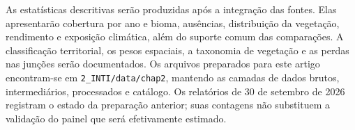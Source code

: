 As estatísticas descritivas serão produzidas após a integração das fontes. Elas apresentarão cobertura por ano e bioma, ausências, distribuição da vegetação, rendimento e exposição climática, além do suporte comum das comparações. A classificação territorial, os pesos espaciais, a taxonomia de vegetação e as perdas nas junções serão documentados. Os arquivos preparados para este artigo encontram-se em \texttt{2\_INTI/data/chap2}, mantendo as camadas de dados brutos, intermediários, processados e catálogo. Os relatórios de 30 de setembro de 2026 registram o estado da preparação anterior; suas contagens não substituem a validação do painel que será efetivamente estimado.
